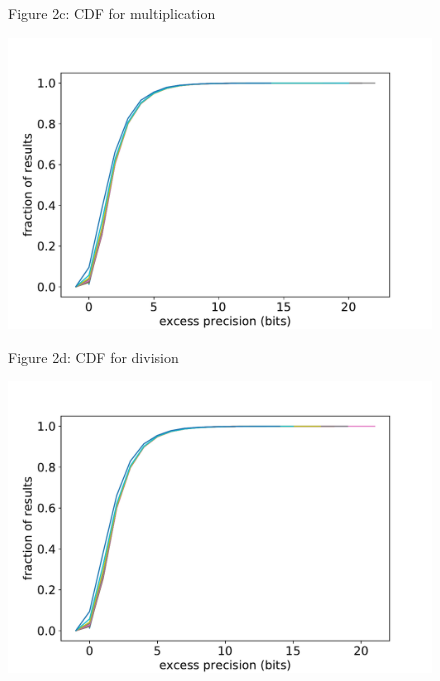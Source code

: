 \documentclass[letterpaper,10pt]{article}
\begin{document}
\begin{figure}
\begin{minipage}{1.2\textwidth}
 \bigskip
 
 \begin{minipage}{0.6\textwidth}
  \begin{center} Figure 2c: CDF for multiplication \end{center} \vspace{-10pt}
  \includegraphics[width=1.0\textwidth]{mul_cdf.pdf}
 \end{minipage}
 \begin{minipage}{0.6\textwidth}
  \begin{center} Figure 2d: CDF for division \end{center} \vspace{-10pt}
  \includegraphics[width=1.0\textwidth]{div_cdf.pdf}
 \end{minipage}
 
 \smallskip
 

\end{minipage}
\end{figure}
\end{document}
